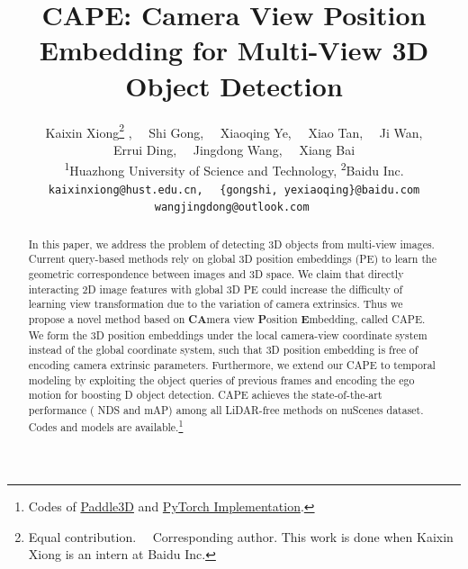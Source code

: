 \documentclass[10pt,twocolumn,letterpaper]{article}
\newcommand{\highNDS}{}
\newcommand{\highmAP}{}
\begin{document}
\title{CAPE: Camera View Position Embedding for Multi-View 3D Object Detection}



\author{
Kaixin Xiong\thanks{Equal contribution. ~~\textsuperscript{\dag}Corresponding author. This work is done when Kaixin Xiong is an intern at Baidu Inc. } , \ \  
Shi Gong, \ \  
Xiaoqing Ye, \ \  
Xiao Tan, \ \  
Ji Wan, \\
Errui Ding, \ \
Jingdong Wang, \ \
Xiang Bai\\
\textsuperscript{1}Huazhong University of Science and Technology, 
\textsuperscript{2}Baidu Inc.\\
{\tt\small kaixinxiong@hust.edu.cn,} \ \
{\tt\small \{gongshi, yexiaoqing\}@baidu.com} \ \
{\tt\small wangjingdong@outlook.com} \ \
}
\maketitle

\begin{abstract}

In this paper, we address the problem of detecting 3D objects from multi-view images.
Current query-based methods rely on global 3D position embeddings (PE) to learn the geometric correspondence between images and 3D space.
We claim that directly interacting 2D image features with global 3D PE 
could increase the difficulty of learning view transformation due to the variation of camera extrinsics.
Thus we propose a novel method based on \textbf{CA}mera view \textbf{P}osition \textbf{E}mbedding, called CAPE.
We form the 3D position embeddings under the local camera-view coordinate system instead of the global coordinate system, such that 3D position embedding is free of encoding camera extrinsic parameters. 
Furthermore, we extend our CAPE to temporal modeling by exploiting the object queries of previous frames and encoding the ego motion for boosting D object detection. CAPE achieves the state-of-the-art performance (\highNDS{} NDS and \highmAP{} mAP) among all LiDAR-free methods on nuScenes dataset.
Codes and models are available.\footnote{Codes of \href{https://github.com/PaddlePaddle/Paddle3D}{Paddle3D} and \href{https://github.com/kaixinbear/CAPE}{PyTorch Implementation}.}











\end{abstract}
\end{document}
